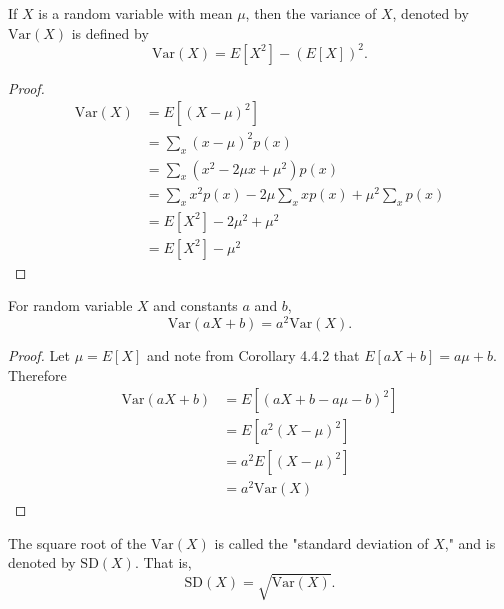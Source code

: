 \documentclass[a4paper,8pt]{article}
\begin{document}
\begin{outline}
    If \(X\) is a random variable with mean \(\mu\), then the variance of \(X\), denoted by \(\text{Var}(X)\)
    is defined by \[\text{Var}(X) = E[X^2]-(E[X])^2\text{.} \]

    \begin{proof}
      \begin{align*}
        \text{Var}(X) &= E[(X-\mu)^2] \\
                      &= \sum_x(x-\mu)^2p(x) \\
                      &= \sum_x(x^2-2\mu x+\mu^2)p(x) \\
                      &= \sum_x x^2p(x) - 2\mu\sum_x xp(x) + \mu^2\sum_x p(x) \\
                      &= E[X^2] - 2\mu^2 + \mu^2 \\
                      &= E[X^2] - \mu^2
      \end{align*}
    \end{proof}

    For random variable \(X\) and constants \(a\) and \(b\),
    \[ \text{Var}(aX+b) = a^2\text{Var}(X)\text{.} \]

    \begin{proof}
      Let \(\mu = E[X]\) and note from Corollary 4.4.2 that \(E[aX+b] = a\mu+b\).
      Therefore
      \begin{align*}
        \text{Var}(aX+b) &= E[(aX+b-a\mu-b)^2] \\
                         &= E[a^2(X-\mu)^2] \\
                         &= a^2E[(X-\mu)^2] \\
                         &= a^2\text{Var}(X)
      \end{align*}
    \end{proof}

    The square root of the \(\text{Var}(X)\) is called the "standard deviation of \(X\)," and is denoted by
    \(\text{SD}(X)\). That is, \[\text{SD}(X) = \sqrt{\text{Var}(X)}\text{.}\]

\end{outline}
\end{document}
